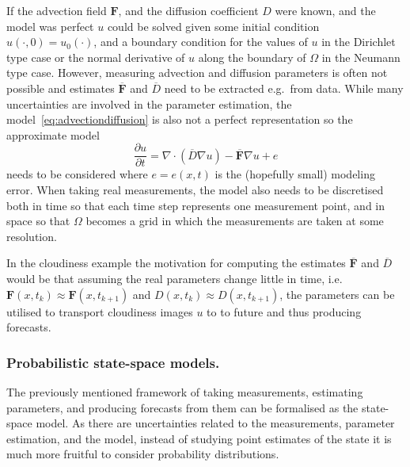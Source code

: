 If the advection field $\mathbf{F}$, and the diffusion coefficient $D$ were known, and the model was perfect $u$ could be solved given some initial condition $u(\cdot, 0) = u_0(\cdot)$, and a boundary condition for the values of $u$ in the Dirichlet type case or the normal derivative of $u$ along the boundary of $\Omega$ in the Neumann type case.
However, measuring advection and diffusion parameters is often not possible and estimates $\overline{\mathbf{F}}$ and $\overline{D}$ need to be extracted e.g.\ from data.
While many uncertainties are involved in the parameter estimation, the model~\eqref{eq:advectiondiffusion} is also not a perfect representation so the approximate model
\begin{equation}\label{eq:advectiondiffusion_approx}
    \frac{\partial u}{\partial t} = \nabla \cdot (\overline{D} \nabla u) - \overline{\mathbf{F}} \nabla u + e
\end{equation}
needs to be considered where $e = e(x,t)$ is the (hopefully small) modeling error.
When taking real measurements, the model also needs to be discretised both in time so that each time step represents one measurement point, and in space so that $\Omega$ becomes a grid in which the measurements are taken at some resolution.

In the cloudiness example the motivation for computing the estimates $\overline{\mathbf{F}}$ and $\overline{D}$ would be that assuming the real parameters change little in time, i.e.\ $\mathbf{F}(x,t_{k}) \approx \mathbf{F}(x,t_{k+1})$ and $D(x,t_{k}) \approx D(x,t_{k+1})$, the parameters can be utilised to transport cloudiness images $u$ to to future and thus producing forecasts.

\subsubsection{Probabilistic state-space models.}
The previously mentioned framework of taking measurements, estimating parameters, and producing forecasts from them can be formalised as the state-space model.
As there are uncertainties related to the measurements, parameter estimation, and the model, instead of studying point estimates of the state it is much more fruitful to consider probability distributions.


